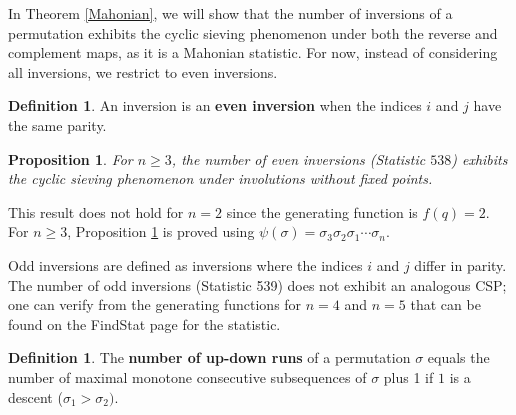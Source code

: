 \documentclass{amsart}
\newtheorem{prop}[thm]{Proposition}
\theoremstyle{definition}
\newtheorem{definition}[thm]{Definition}
\begin{document}
In Theorem \ref{Mahonian}, we will show that the number of inversions of a permutation exhibits the cyclic sieving phenomenon under both the reverse and complement maps, as it is a Mahonian statistic. For now, instead of considering all inversions, we restrict to even inversions.

\begin{definition} An inversion is an \textbf{even inversion} when the indices $i$ and $j$ have the same parity.
\end{definition}

\begin{prop}\label{ev_inv}
  For $n \geq 3$, the number of even inversions (Statistic $538$) exhibits the cyclic sieving phenomenon under involutions without fixed points.
\end{prop}

This result does not hold for $n = 2$ since the generating function is $f(q) = 2$. For $n \geq 3$, Proposition \ref{ev_inv} is proved using $\psi(\sigma) = \sigma_3\sigma_2\sigma_1 \dotsm \sigma_n$.
%

Odd inversions are defined as inversions where the indices $i$ and $j$ differ in parity. The number of odd inversions  (Statistic 539) does not exhibit an analogous CSP; one can verify from the generating functions for $n=4$ and $n=5$ that can be found on the FindStat page for the statistic.

\begin{definition}
  The \textbf{number of up-down runs} of a permutation $\sigma$ equals the number of maximal monotone consecutive subsequences of $\sigma$ plus 1 if $1$ is a descent ($\sigma_1 > \sigma_2)$.
\end{definition}
\end{document}
